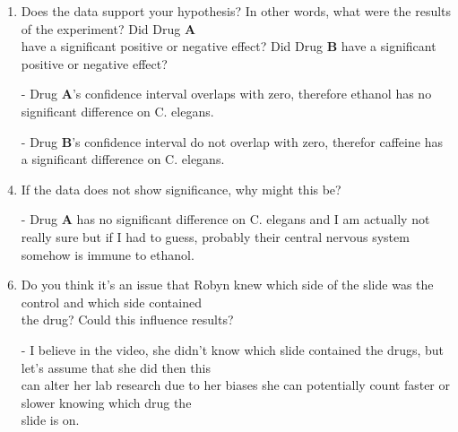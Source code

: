 \documentclass{article}
\def\DA#1{\textcolor{B}{\textbf{#1}}}
\def\DB#1{\textcolor{G}{\textbf{#1}}}
\begin{document}
\begin{center}
{\begin{minipage}{53em}
\begin{enumerate}
      \item Does the data support your hypothesis? In other words, what were the results of the experiment? Did Drug \DA{A}\\have a significant positive or negative effect? Did Drug \DB{B} have a significant positive or negative effect?
      \item[-] Drug \DA{A}'s confidence interval overlaps with zero, therefore ethanol has no significant difference on C. elegans.
      \item[-] Drug \DB{B}'s confidence interval do not overlap with zero, therefor caffeine has a significant difference on C. elegans.
      \item If the data does not show significance, why might this be?
      \item[-] Drug \DA{A} has no significant difference on C. elegans and I am actually not really sure but if I had to guess, probably their central nervous system somehow is immune to ethanol.
      \item Do you think it's an issue that Robyn knew which side of the slide was the control and which side contained\\the drug? Could this influence results?
      \item[-] I believe in the video, she didn't know which slide contained the drugs, but let's assume that she did then this\\can alter her lab research due to her biases she can potentially count faster or slower knowing which drug the\\slide is on.
    \end{enumerate}
  \end{minipage}}
\end{center}
\end{document}
